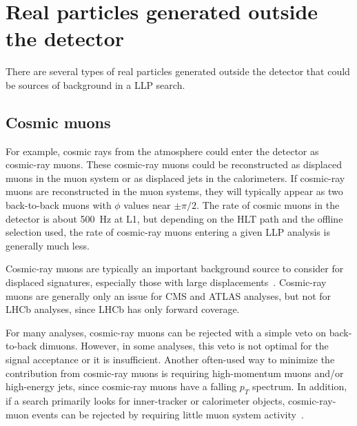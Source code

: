 \section{Real particles generated outside the detector} %

There are several types of real particles generated outside the detector that could be sources of background in a LLP search.

\subsection{Cosmic muons} %

For example, cosmic rays from the atmosphere could enter the detector as cosmic-ray muons. These cosmic-ray muons could be reconstructed as displaced muons in the muon system or as displaced jets in the calorimeters. If cosmic-ray muons are reconstructed in the muon systems, they will typically appear as two back-to-back muons with $\phi$ values near $\pm\pi/2$. The rate of cosmic muons in the detector is about 500~Hz at L1, but depending on the HLT path and the offline selection used, the rate of cosmic-ray muons entering a given LLP analysis is generally much less.

Cosmic-ray muons are typically an important background source to consider for displaced signatures, especially those with large displacements~\cite{Khachatryan:2015jha, Chatrchyan:2012dxa, Khachatryan:2010uf, Aad:2012zn,Aad:2013gva}. Cosmic-ray muons are generally only an issue for CMS and ATLAS analyses, but not for LHCb analyses, since LHCb has only forward coverage.

For many analyses, cosmic-ray muons can be rejected with a simple veto on back-to-back dimuons. However, in some analyses, this veto is not optimal for the signal acceptance or it is insufficient. Another often-used way to minimize the contribution from cosmic-ray muons is requiring high-momentum muons and/or high-energy jets, since cosmic-ray muons have a falling $p_{T}$ spectrum. In addition, if a search primarily looks for inner-tracker or calorimeter objects, cosmic-ray-muon events can be rejected by requiring little muon system activity~\cite{Khachatryan:2015jha, Chatrchyan:2012dxa, Khachatryan:2010uf}.

